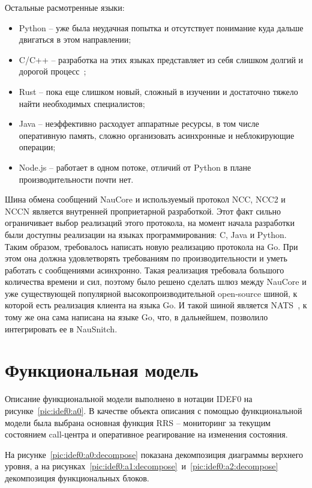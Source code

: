 Остальные расмотренные языки:
\begin{itemize}
    \item Python -- уже была неудачная попытка и отсутствует понимание куда дальше двигаться в этом направлении;
    \item C/C++ -- разработка на этих языках представляет из себя слишком долгий и дорогой процесс~\cite{Goinyandex};
    \item Rust -- пока еще слишком новый, сложный в изучении и достаточно тяжело найти необходимых специалистов;
    \item Java -- неэффективно расходует аппаратные ресурсы, в том числе оперативную память,
    сложно организовать асинхронные и неблокирующие операции;
    \item Node.js -- работает в одном потоке, отличий от Python в плане производительности почти нет.
\end{itemize}

Шина обмена сообщений NauCore и используемый протокол NCC, NCC2 и NCCN является
внутренней проприетарной разработкой.
Этот факт сильно ограничивает выбор реализаций этого протокола,
на момент начала разработки были доступны реализации на языках программирования: C, Java и Python.
Таким образом, требовалось написать новую реализацию протокола на Go.
При этом она должна удовлетворять требованиям по производительности
и уметь работать с сообщениями асинхронно.
Такая реализация требовала большого количества времени и сил,
поэтому было решено сделать шлюз между NauCore и
уже существующей популярной высокопроизводительной open-source шиной,
к которой есть реализация клиента на языка Go.
И такой шиной является NATS~\cite{AboutNATS}, к тому же она сама написана на языке Go,
что, в дальнейшем, позволило интегрировать ее в NauSnitch.

\section{Функциональная модель}

Описание функциональной модели выполнено в нотации IDEF0 на рисунке~\ref{pic:idef0:a0}.
В качестве объекта описания с помощью функциональной модели была выбрана основная функция RRS --
мониторинг за текущим состоянием call-центра и оперативное реагирование на изменения состояния.

На рисунке~\ref{pic:idef0:a0:decompose} показана декомпозиция диаграммы верхнего уровня,
а на рисунках~\ref{pic:idef0:a1:decompose}~и~\ref{pic:idef0:a2:decompose} декомпозиция функциональных блоков.

